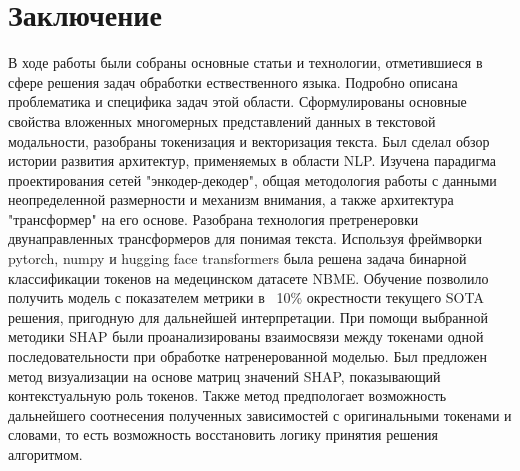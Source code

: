 \section{Заключение}
В ходе работы были собраны основные статьи и технологии, отметившиеся в сфере решения задач обработки ествественного языка. Подробно описана проблематика и специфика задач этой области. Сформулированы основные свойства вложенных многомерных представлений данных в текстовой модальности, разобраны токенизация и векторизация текста.
\newline
Был сделал обзор истории развития архитектур, применяемых в области NLP. Изучена парадигма проектирования сетей "энкодер-декодер", общая методология работы с данными неопределенной размерности и механизм внимания, а также архитектура "трансформер" на его основе. Разобрана технология претренеровки двунаправленных трансформеров для понимая текста.
\newline
Используя фреймворки pytorch, numpy и hugging face transformers была решена задача бинарной классификации токенов на медецинском датасете NBME. Обучение позволило получить модель с показателем метрики в ~10\% окрестности текущего SOTA решения, пригодную для дальнейшей интерпретации.
\newline
При помощи выбранной методики SHAP были проанализированы взаимосвязи между токенами одной последовательности при обработке натренерованной моделью. Был предложен метод визуализации на основе матриц значений SHAP, показывающий контекстуальную роль токенов. Также метод предпологает возможность дальнейшего соотнесения полученных зависимостей с оригинальными токенами и словами, то есть возможность восстановить логику принятия решения алгоритмом.